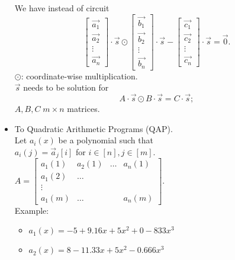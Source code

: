 \documentclass[a4paper, 12pt]{book}
\theoremstyle{definition}
\theoremstyle{remark}
\begin{document}
\begin{itemize}
\begin{itemize}[label={}]
    \end{itemize}
    We have instead of circuit
    \begin{equation*}
      \begin{bmatrix}\overrightarrow{a_1} \\ \overrightarrow{a_2} \\ \vdots \\ \overrightarrow{a_n}\end{bmatrix}
      \cdot \overrightarrow{s} \odot
      \begin{bmatrix}\overrightarrow{b_1} \\ \overrightarrow{b_2} \\ \vdots \\ \overrightarrow{b_n}\end{bmatrix}
      \cdot \overrightarrow{s} -
      \begin{bmatrix}\overrightarrow{c_1} \\ \overrightarrow{c_2} \\ \vdots \\ \overrightarrow{c_n}\end{bmatrix}
      \cdot \overrightarrow{s} = \overrightarrow{0}.
    \end{equation*}
    $\odot$: coordinate-wise multiplication. \\
    $\overrightarrow{s}$ needs to be solution for
    \begin{equation*}
      A \cdot \overrightarrow{s} \odot B \cdot \overrightarrow{s} = C \cdot \overrightarrow{s};
    \end{equation*}
    $A, B, C \; m \times n$ matrices.
  \item To Quadratic Arithmetic Programs (QAP). \\
    Let $a_i(x)$ be a polynomial such that \\
    $a_i(j) = \overrightarrow{a}_j[i]$ for $i \in [n], j \in [m]$. \\
    $A = \begin{bmatrix}
      a_1(1) & a_2(1) & \dots & a_n(1) \\
      a_1(2) & \dots & & \\
      \vdots & & & \\
      a_1(m) & \dots & & a_n(m)
    \end{bmatrix}$. \\
    Example:
    \begin{itemize}[label={}]
      \item $a_1(x) = -5 + 9.16x + 5x^2 + 0-833x^3$
      \item $a_2(x) = 8 - 11.33x + 5x^2 - 0.666x^3$

\end{itemize}
\end{itemize}
\end{document}
